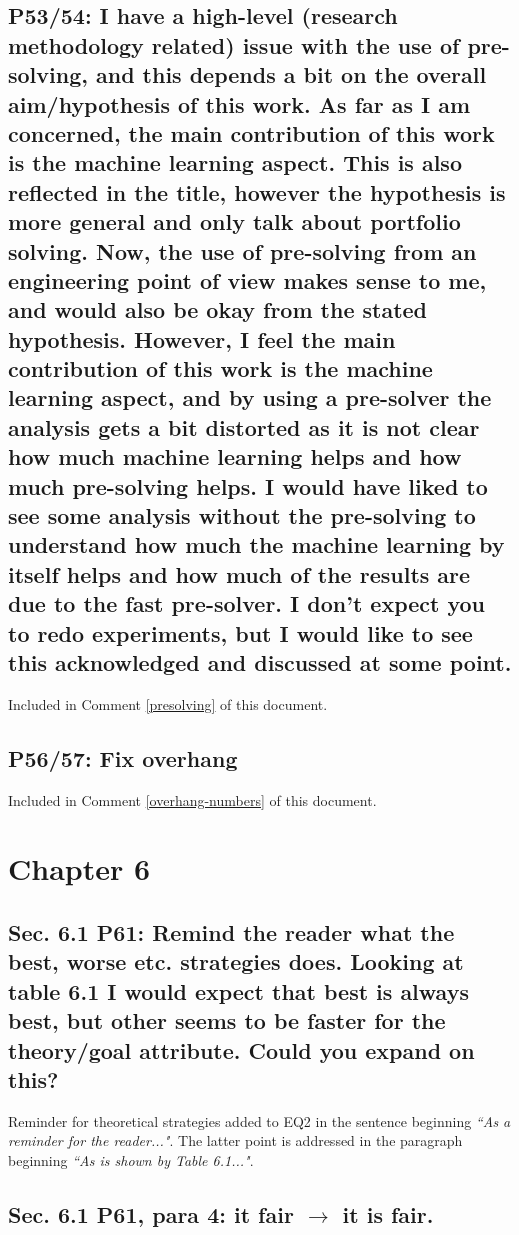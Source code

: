 \documentclass[]{article}
\begin{document}
\subsection{P53/54: I have a high-level (research methodology related) issue with the use of pre-solving, and this depends a bit on the overall aim/hypothesis of this work. As far as I am concerned, the main contribution of this work is the machine learning aspect. This is also reflected in the title, however the hypothesis is more general and only talk about portfolio solving. Now, the use of pre-solving from an engineering point of view makes sense to me, and would also be okay from the stated hypothesis. However, I feel the main contribution of this work is the machine learning aspect, and by using a pre-solver the analysis gets a bit distorted as it is not clear how much machine learning helps and how much pre-solving helps. I would have liked to see some analysis without the pre-solving to understand how much the machine learning by itself helps and how much of the results are due to the fast pre-solver. I don't expect you to redo experiments, but I would like to see this acknowledged and discussed at some point.}

Included in Comment \ref{presolving} of this document.

\subsection{P56/57: Fix overhang}

Included in Comment \ref{overhang-numbers} of this document.

\section{Chapter 6}

\subsection{Sec. 6.1 P61: Remind the reader what the best, worse etc. strategies does. Looking at table 6.1 I would expect that best is always best, but other seems to be faster for the theory/goal attribute. Could you expand on this?}

Reminder for theoretical strategies added to EQ2 in the sentence beginning \emph{``As a reminder for the reader..."}.
The latter point is addressed in the paragraph beginning \emph{``As is shown by Table 6.1..."}.

\subsection{Sec. 6.1 P61, para 4: it fair $\rightarrow$ it is fair.}
\end{document}

